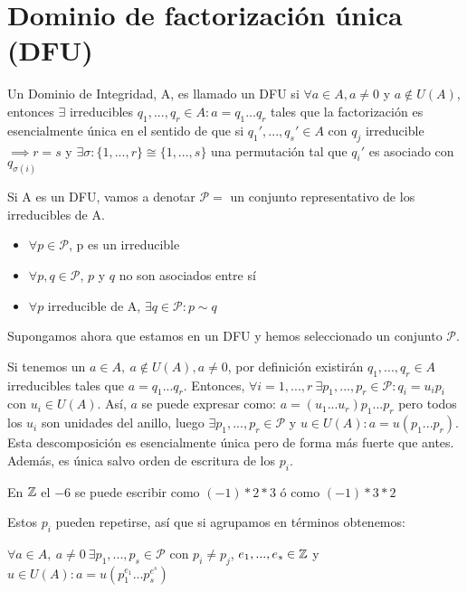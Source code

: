 \section{Dominio de factorización única (DFU)}

Un Dominio de Integridad, A, es llamado un DFU si $\forall a \in A, a\ne 0$ y $a\notin U(A)$, entonces $\exists$ irreducibles $q_1 ,...,q_r \in A : a = q_1 ...q_r$ tales que la factorización es esencialmente única en el sentido de que si $q_1' ,...,q_s' \in A $ con $q_j$ irreducible $\implies r = s$ y $\exists \sigma:\{1,...,r\} \cong \{1,...,s\}$ una permutación tal que $q_i'$ es asociado con $q_{\sigma(i)}$

\begin{ndef}
	Si A es un DFU, vamos a denotar $\mathcal{P}= $ un conjunto representativo de los irreducibles de A.
\end{ndef}

\begin{itemize}
\item $\forall p \in \mathcal{P}$, p es un irreducible
\item $\forall p, q \in \mathcal{P}$, $p$ y $q$ no son asociados entre sí
\item $\forall p $ irreducible de A, $\exists q \in \mathcal{P} : p \sim q$
\end{itemize}

Supongamos ahora que estamos en un DFU y hemos seleccionado un conjunto $\mathcal{P}$.

Si tenemos un $a\in A,\ a \notin U(A), a \ne 0$, por definición existirán $q_1 ,...,q_r \in A $ irreducibles tales que $a = q_1...q_r $. Entonces, $\forall i = 1,...,r\ \exists p_1,...,p_r \in \mathcal{P} : q_i = u_ip_i $ con $u_i \in U(A)$. Así, $a$ se puede expresar como: $a = (u_1...u_r)p_1...p_r$ pero todos los $u_i$ son unidades del anillo, luego $\exists p_1,...,p_r \in \mathcal{P} $ y $u \in U(A) : a = u(p_1...p_r)$. Esta descomposición es esencialmente única pero de forma más fuerte que antes. Además, es única salvo orden de escritura de los $p_i$.

\begin{ejemplo}
	En $\mathbb{Z}$ el $-6$ se puede escribir como $(-1)*2*3$ ó como $(-1)*3*2$
\end{ejemplo}

Estos $p_i$ pueden repetirse, así que si agrupamos en términos obtenemos:

$\forall a \in A,\ a \ne 0\ \exists p_1,...,p_s \in \mathcal{P}$ con $p_i \ne p_j$, $e_1,...,e_s \in \mathbb{Z}$ y $ u \in U(A) : a = u(p_1^{e_1}...p_s^{e^s})$


